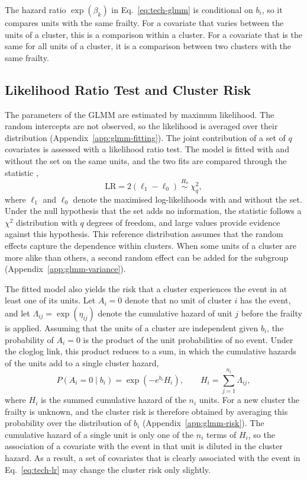 The hazard ratio $\exp(\beta_k)$ in Eq.~\eqref{eq:tech-glmm} is conditional on $b_i$, so it compares units with the same frailty.
For a covariate that varies between the units of a cluster, this is a comparison within a cluster.
For a covariate that is the same for all units of a cluster, it is a comparison between two clusters with the same frailty.

\subsection{Likelihood Ratio Test and Cluster Risk}
\label{sec:tech-glmm-likelihood}

The parameters of the GLMM are estimated by maximum likelihood.
The random intercepts are not observed, so the likelihood is averaged over their distribution (Appendix~\ref{app:glmm-fitting}).
The joint contribution of a set of $q$ covariates is assessed with a likelihood ratio test.
The model is fitted with and without the set on the same units, and the two fits are compared through the statistic \cite[Sections~5.7 and~11.7]{dobson2002glm},
\begin{equation}
  \mathrm{LR} = 2\left(\ell_1 - \ell_0\right) \;\overset{H_0}{\sim}\; \chi^2_q ,
  \label{eq:tech-lr}
\end{equation}
where $\ell_1$ and $\ell_0$ denote the maximised log-likelihoods with and without the set.
Under the null hypothesis that the set adds no information, the statistic follows a $\chi^2$ distribution with $q$ degrees of freedom, and large values provide evidence against this hypothesis.
This reference distribution assumes that the random effects capture the dependence within clusters.
When some units of a cluster are more alike than others, a second random effect can be added for the subgroup (Appendix~\ref{app:glmm-variance}).

\label{sec:tech-aggregation}%
The fitted model also yields the risk that a cluster experiences the event in at least one of its units.
Let $A_i = 0$ denote that no unit of cluster $i$ has the event, and let $\Lambda_{ij} = \exp(\eta_{ij})$ denote the cumulative hazard of unit $j$ before the frailty is applied.
Assuming that the units of a cluster are independent given $b_i$, the probability of $A_i = 0$ is the product of the unit probabilities of no event.
Under the cloglog link, this product reduces to a sum, in which the cumulative hazards of the units add to a single cluster hazard,
\begin{equation}
  P(A_i = 0 \mid b_i) = \exp\!\left(-e^{b_i} H_i\right),
  \qquad
  H_i = \sum_{j=1}^{n_i} \Lambda_{ij} ,
  \label{eq:tech-agg-conditional}
\end{equation}
where $H_i$ is the summed cumulative hazard of the $n_i$ units.
For a new cluster the frailty is unknown, and the cluster risk is therefore obtained by averaging this probability over the distribution of $b_i$ (Appendix~\ref{app:glmm-risk}).
The cumulative hazard of a single unit is only one of the $n_i$ terms of $H_i$, so the association of a covariate with the event in that unit is diluted in the cluster hazard.
As a result, a set of covariates that is clearly associated with the event in Eq.~\eqref{eq:tech-lr} may change the cluster risk only slightly.
